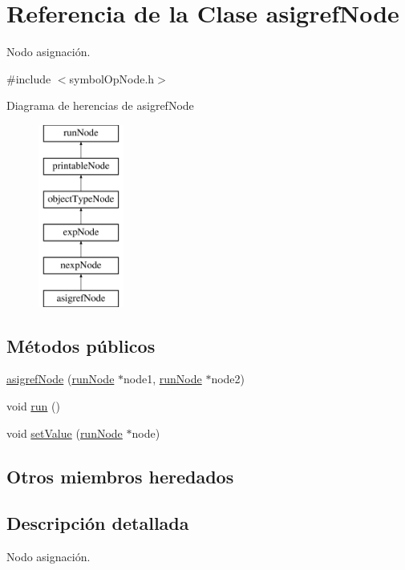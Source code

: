 \hypertarget{classasigrefNode}{\section{Referencia de la Clase asigref\-Node}
\label{classasigrefNode}
}


Nodo asignación.  




{\ttfamily \#include $<$symbol\-Op\-Node.\-h$>$}

Diagrama de herencias de asigref\-Node\begin{figure}[H]
\begin{center}
\leavevmode
\includegraphics[height=6.000000cm]{classasigrefNode}
\end{center}
\end{figure}
\subsection*{Métodos públicos}
\begin{DoxyCompactItemize}
\item 
\hyperlink{classasigrefNode_a817c24e32d9c8d28298172ffe97978ba}{asigref\-Node} (\hyperlink{classrunNode}{run\-Node} $\ast$node1, \hyperlink{classrunNode}{run\-Node} $\ast$node2)
\item 
void \hyperlink{classasigrefNode_a208e32830e6f43157a94d993c599ed00}{run} ()
\item 
void \hyperlink{classasigrefNode_ae88032a024d5e5033b53cac65f14b0c4}{set\-Value} (\hyperlink{classrunNode}{run\-Node} $\ast$node)
\end{DoxyCompactItemize}
\subsection*{Otros miembros heredados}


\subsection{Descripción detallada}
Nodo asignación. 

